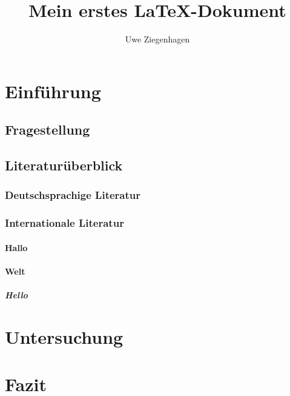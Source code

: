 \documentclass[12pt]{scrartcl}
\author{Uwe Ziegenhagen}
\title{Mein erstes \LaTeX-Dokument}
\begin{document}
\maketitle

\section{Einführung}
\subsection{Fragestellung}

\blindtext[5]

\subsection{Literaturüberblick}
\subsubsection{Deutschsprachige Literatur}

\blindtext[5]

\subsubsection{Internationale Literatur}

\blindtext[5]

\paragraph{Hallo} \blindtext[5]

\paragraph{Welt} \blindtext[5]

\subparagraph{Hello} \blindtext[5]


\section{Untersuchung}

\blindtext[5]

\section{Fazit}

\blindtext[5]
\end{document}
